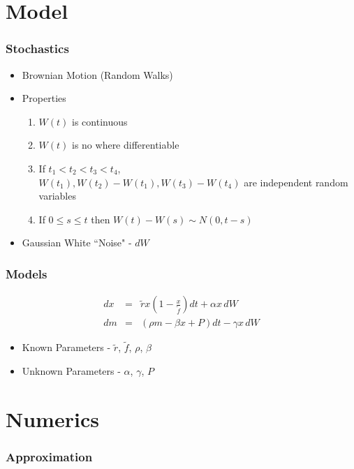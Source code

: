 
\section{Model}

\begin{frame}
    \frametitle{Stochastics}
	\begin{itemize}
		\item Brownian Motion (Random Walks)
		\item Properties
	\begin{enumerate}[i]
		\item $W(t)$ is continuous
		\item $W(t)$ is no where differentiable
		\item If $t_{1}<t_{2}<t_{3}<t_{4}$, \\
			$W(t_{1}), W(t_{2})-W(t_{1}),  W(t_{3})-W(t_{4})$ are independent random variables
		\item If $0 \le s\le t$ then $W(t)-W(s) \sim N(0, t-s)$
	\end{enumerate}
		\item Gaussian White ``Noise" - $dW$
	\end{itemize}
\end{frame}



\begin{frame}
    \frametitle{Models}
	\begin{eqnarray}
		dx &=& \tilde{r} x \left( 1- \frac{x}{\tilde{f}}\right) dt +\alpha x \, dW \\
		dm &=& ( \rho m - \beta x + P) dt - \gamma x \, dW
	\end{eqnarray}
	\begin{itemize}
		\item Known Parameters - $\tilde{r}$, $\tilde{f}$, $\rho$, $\beta$
		\item Unknown Parameters - $\alpha$, $\gamma$, $P$
	\end{itemize}
\end{frame}




\section{Numerics}

\begin{frame}
   \frametitle{Approximation}
\end{frame}



